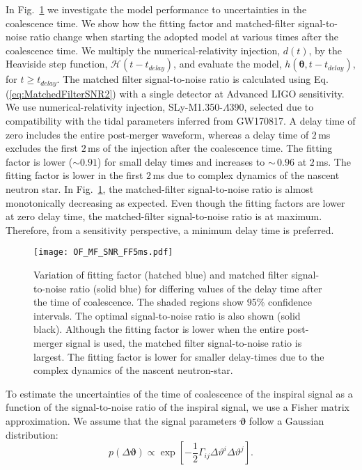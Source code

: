 \documentclass[../Thesis.tex]{subfiles}
\begin{document}
     In Fig.~\ref{fig:OF_MF_SNR_FF5ms} we investigate the model performance to uncertainties in the coalescence time.
     We show how the fitting factor and matched-filter signal-to-noise ratio change when starting the adopted model at various times after the coalescence time.
     We multiply the numerical-relativity injection, $d(t)$, by the Heaviside step function, $\mathcal{H}(t-t_{delay})$, and evaluate the model, $h(\boldsymbol{\theta},t-t_{delay})$, for $t \geq t_{delay}$.
     The matched filter signal-to-noise ratio is calculated using Eq.(\ref{eq:MatchedFilterSNR2}) with a single detector at Advanced LIGO sensitivity.
     We use numerical-relativity injection, SLy-M1.350-$\Lambda$390, selected due to compatibility with the tidal parameters inferred from GW170817.
     A delay time of zero includes the entire post-merger waveform, whereas a delay time of $2\,$ms excludes the first $2\,$ms of the injection after the coalescence time. 
     The fitting factor is lower ($\sim 0.91$) for small delay times and increases to $\sim\,0.96$ at $2\,$ms. 
     The fitting factor is lower in the first $2\,$ms due to complex dynamics of the nascent neutron star.
     In Fig.~\ref{fig:OF_MF_SNR_FF5ms}, the matched-filter signal-to-noise ratio is almost monotonically decreasing as expected. 
     Even though the fitting factors are lower at zero delay time, the matched-filter signal-to-noise ratio is at maximum. 
     Therefore, from a sensitivity perspective, a minimum delay time is preferred.
\begin{figure}[H]
         \centering
         \texttt{[image: OF\_MF\_SNR\_FF5ms.pdf]}
         \caption{Variation of fitting factor (hatched blue) and matched filter  signal-to-noise ratio (solid blue) for differing values of the delay time after the time of coalescence. The shaded regions show 95\% confidence intervals. The optimal signal-to-noise ratio is also shown (solid black). Although the fitting factor is lower when the entire post-merger signal is used, the matched filter signal-to-noise ratio is largest. The fitting factor is lower for smaller delay-times due to the complex dynamics of the nascent neutron-star.}
     \label{fig:OF_MF_SNR_FF5ms}
     \end{figure}  
     To estimate the uncertainties of the time of coalescence of the inspiral signal as a function of the signal-to-noise ratio of the inspiral signal, we use a Fisher matrix approximation. 
     We assume that the signal parameters $\boldsymbol{\vartheta}$ follow a Gaussian distribution: 
\begin{equation}
    p \left( \Delta \boldsymbol{\vartheta} \right) \propto \exp \left[-\frac{1}{2}\Gamma_{ij}\Delta \vartheta^i \Delta \vartheta^j\right].
\end{equation}
\end{document}

